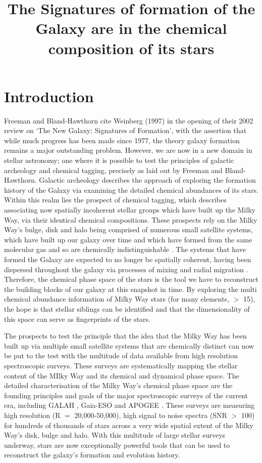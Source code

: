 \documentclass[12pt, preprint]{aastex}
\begin{document}
\title{The Signatures of formation of the Galaxy are in the chemical composition of its stars }

\section{Introduction}\label{sec:Intro}

Freeman and Bland-Hawthorn cite Weinberg (1997) in the opening of their 2002 review on `The New Galaxy: Signatures of Formation', with the assertion that while much progress has been made since 1977, the  theory galaxy formation remains a major outstanding problem. However, we are now in a new domain in stellar astronomy; one where it is possible to test the principles of galactic archeology and chemical tagging, precisely as laid out by Freeman and Bland-Hawthorn. Galactic archeology describes the approach of exploring the formation history of the Galaxy via examining the detailed chemical abundances of its stars. Within this realm lies the prospect of chemical tagging, which describes associating now spatially incoherent stellar groups which have built up the Milky Way, via their identical chemical compositions. These prospects rely on the Milky Way's bulge, disk and halo being comprised of numerous small satellite systems, which have built up our galaxy over time and which have formed from the same molecular gas and so are chemically indistinguishable \citep[see][and references therein]{DaSilva2015}. The systems that have formed the Galaxy are expected to no longer be spatially coherent, having been dispersed throughout the galaxy via processes of mixing and radial migration \citep[e.g.][]{Roskar et al., 2009, Quillen2015}. Therefore, the chemical phase space of the stars is the tool we have to reconstruct the building blocks of our galaxy at this snapshot in time.  By exploring the multi chemical abundance information of Milky Way stars (for many elements,  $>$ 15), the hope is that stellar siblings can be identified and that the dimensionality of this space can serve as fingerprints of the stars. 

The prospects to test the principle that the idea that the Milky Way has been built up via multiple small satellite systems that are chemically distinct can now be put to the test with the multitude of data available from high resolution spectroscopic surveys. These surveys are systematically mapping the stellar content of the MIlky Way and its chemical and dynamical phase space. The detailed characterisation of the Milky Way's chemical phase space are the founding principles and goals of the major spectroscopic surveys of the current era, including GALAH \citep{Freeman2013, da Silva 2015}, Gaia-ESO \citep{Gilmore 2012} and APOGEE \citep{Majewsk2015}. These surveys are measuring high resolution (R $=$ 20,000-50,000), high signal to noise spectra (SNR $>$ 100) for hundreds of thousands of stars across a very wide spatial extent of the Milky Way's disk, bulge and halo. With this multitude of large stellar surveys underway, stars are now exceptionally powerful tools that can be used to reconstruct the galaxy's formation and evolution history.  
\end{document}
